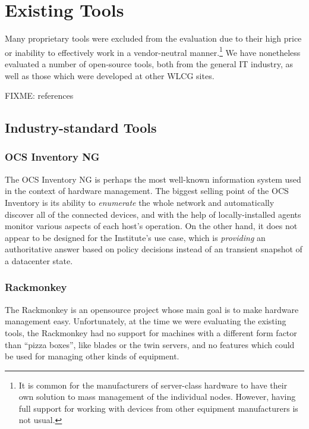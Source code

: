 \documentclass[deska]{subfiles}
\begin{document}
\appendix
\chapter{Existing Tools}
\label{sec:evaluating-existing-tools}

Many proprietary tools were excluded from the evaluation due to their high price or inability to effectively work in a
vendor-neutral manner.\footnote{It is common for the manufacturers of server-class hardware to have their own solution
to mass management of the individual nodes.  However, having full support for working with devices from other equipment
manufacturers is not usual.}  We have nonetheless evaluated a number of open-source tools, both from the general IT
industry, as well as those which were developed at other WLCG sites.

FIXME: references

\section{Industry-standard Tools}

\subsection{OCS Inventory NG}

The OCS Inventory NG is perhaps the most well-known information system used in the context of hardware management.  The
biggest selling point of the OCS Inventory is its ability to {\em enumerate} the whole network and automatically
discover all of the connected devices, and with the help of locally-installed agents monitor various aspects of each
host's operation.  On the other hand, it does not appear to be designed for the Institute's use case, which is {\em
providing} an authoritative answer based on policy decisions instead of an transient snapshot of a datacenter state.

\subsection{Rackmonkey}

The Rackmonkey is an opensource project whose main goal is to make hardware management easy.  Unfortunately, at the time
we were evaluating the existing tools, the Rackmonkey had no support for machines with a different form factor than
``pizza boxes'', like blades or the twin servers, and no features which could be used for managing other kinds of
equipment.
\end{document}
